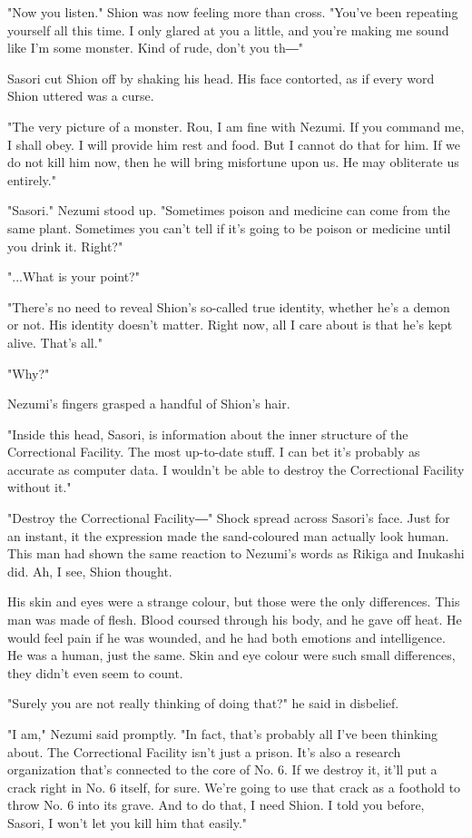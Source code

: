 "Now you listen." Shion was now feeling more than cross. "You've been
repeating yourself all this time. I only glared at you a little, and
you're making me sound like I'm some monster. Kind of rude, don't you
th―"

Sasori cut Shion off by shaking his head. His face contorted, as if
every word Shion uttered was a curse.

"The very picture of a monster. Rou, I am fine with Nezumi. If you
command me, I shall obey. I will provide him rest and food. But I cannot
do that for him. If we do not kill him now, then he will bring
misfortune upon us. He may obliterate us entirely."

"Sasori." Nezumi stood up. "Sometimes poison and medicine can come from
the same plant. Sometimes you can't tell if it's going to be poison or
medicine until you drink it. Right?"

"...What is your point?"

"There's no need to reveal Shion's so-called true identity, whether he's
a demon or not. His identity doesn't matter. Right now, all I care about
is that he's kept alive. That's all."

"Why?"

Nezumi's fingers grasped a handful of Shion's hair.

"Inside this head, Sasori, is information about the inner structure of
the Correctional Facility. The most up-to-date stuff. I can bet it's
probably as accurate as computer data. I wouldn't be able to destroy the
Correctional Facility without it."

"Destroy the Correctional Facility―" Shock spread across Sasori's face.
Just for an instant, it the expression made the sand-coloured man
actually look human. This man had shown the same reaction to Nezumi's
words as Rikiga and Inukashi did. Ah, I see, Shion thought.

His skin and eyes were a strange colour, but those were the only
differences. This man was made of flesh. Blood coursed through his body,
and he gave off heat. He would feel pain if he was wounded, and he had
both emotions and intelligence. He was a human, just the same. Skin and
eye colour were such small differences, they didn't even seem to count.

"Surely you are not really thinking of doing that?" he said in
disbelief.

"I am," Nezumi said promptly. "In fact, that's probably all I've been
thinking about. The Correctional Facility isn't just a prison. It's also
a research organization that's connected to the core of No. 6. If we
destroy it, it'll put a crack right in No. 6 itself, for sure. We're
going to use that crack as a foothold to throw No. 6 into its grave. And
to do that, I need Shion. I told you before, Sasori, I won't let you
kill him that easily."

